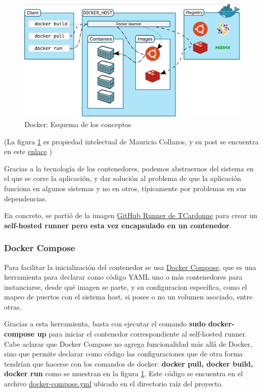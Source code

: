 \begin{figure}[H]
    \centering
    \includegraphics[width=1\textwidth]{fig/docker.png}
    \caption{Docker: Esquema de los conceptos}
    \label{fig:docker}
\end{figure}

(La figura \ref{fig:docker} es propiedad intelectual de Mauricio Collazos, y su post se encuentra en este \href{https://medium.com/ingenier%C3%ADa-en-tranqui-finanzas/una-gu%C3%ADa-no-tan-r%C3%A1pida-de-docker-y-kubernetes-933f5b6709df } {enlace} )

Gracias a la tecnología de los contenedores, podemos abstraernos del sistema en el  que se corre la aplicación, y dar solución al problema de que la aplicación funciona en algunos sistemas y no en otros, típicamente por problemas en sus dependencias.

En concreto, se partió de la imagen \href{https://registry.hub.docker.com/r/tcardonne/github-runner}{GitHub Runner de TCardonne} para crear un \textbf{self-hosted runner pero esta vez encapsulado en un contenedor}.

\subsubsection{Docker Compose}

Para facilitar la inicialización del contenedor se usa \href{https://docs.docker.com/compose/}{Docker Compose}, que es una herramienta para declarar como código YAML uno o más contenedores para instanciarse, desde qué imagen se parte, y su configuracion específica, como el mapeo de puertos con el sistema host, si posee o no un volumen asociado, entre otras. 

Gracias a esta herramienta, basta con ejecutar el comando \textbf{sudo docker-compose up} para iniciar el contenedor correspondiente al self-hosted runner. Cabe aclarar que Docker Compose no agrega funcionalidad más allá de Docker, sino que permite declarar como código las configuraciones que de otra forma tendrían que hacerse con los comandos de docker: \textbf{docker pull, docker build, docker run} como se muestran en la figura \ref{fig:docker}. Este código se encuentra en el archivo \href{https://github.com/FeedehC/pipeline-esp32/blob/main/docker-compose.yml}{docker-compose.yml} ubicado en el directorio raíz del proyecto.

